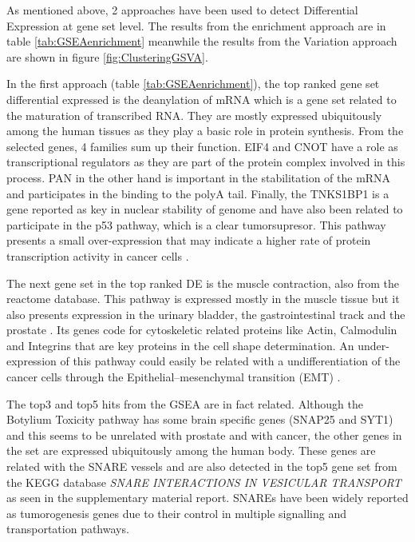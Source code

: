 \documentclass[9pt,twocolumn,twoside]{gsajnl}
\begin{document}
As mentioned above, 2 approaches have been used to detect Differential Expression at gene set level. The results from the enrichment approach are in table \ref{tab:GSEAenrichment} meanwhile the results from the Variation approach are shown in figure \ref{fig:ClusteringGSVA}.

In the first approach (table \ref{tab:GSEAenrichment}), the top ranked gene set differential expressed is the deanylation of mRNA which is a gene set related to the maturation of transcribed RNA. They are mostly expressed ubiquitously among the human tissues as they play a basic role in protein synthesis. From the selected genes, 4 families sum up their function. EIF4 and CNOT have a role as transcriptional regulators as they are part of the protein complex involved in this process. PAN in the other hand is important in the stabilitation of the mRNA and participates in the binding to the polyA tail. Finally, the TNKS1BP1 is a gene reported as key in nuclear stability of genome and have also been related to participate in the p53 pathway, which is a clear tumorsupresor. This pathway presents a small over-expression that may indicate a higher rate of protein transcription activity in cancer cells \cite{proteinatlas,uhlen2015tissue}.

The next gene set in the top ranked DE is the muscle contraction, also from the reactome database. This pathway is expressed mostly in the muscle tissue but it also presents expression in the urinary bladder, the gastrointestinal track and the prostate \cite{proteinatlas,uhlen2015tissue}. Its genes code for cytoskeletic related proteins like Actin, Calmodulin and Integrins that are key proteins in the cell shape determination. An under-expression of this pathway could easily be related with a undifferentiation of the cancer cells through the Epithelial–mesenchymal transition (EMT) \citep{yilmaz2009emt}.

The top3 and top5 hits from the GSEA are in fact related. Although the Botylium Toxicity pathway has some brain specific genes (SNAP25 and SYT1) and this seems to be unrelated with prostate and with cancer, the other genes in the set are expressed ubiquitously among the human body. These genes are related with the SNARE vessels and are also detected in the top5 gene set from the KEGG database \textit{SNARE INTERACTIONS IN VESICULAR TRANSPORT} as seen in the supplementary material report. SNAREs have been widely reported as tumorogenesis genes due to their control in multiple signalling and transportation pathways.
\end{document}
